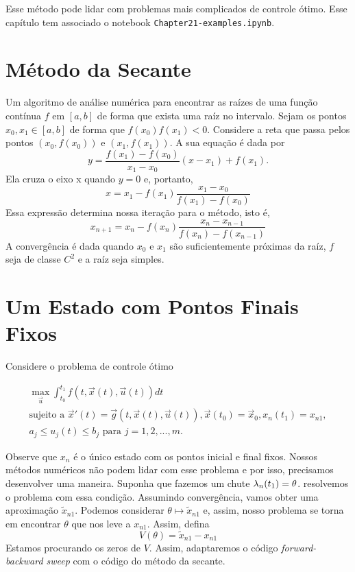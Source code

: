 Esse método pode lidar com problemas mais complicados de controle ótimo. Esse
capítulo tem associado o notebook \texttt{Chapter21-examples.ipynb}. 

\section{Método da Secante}

Um algoritmo de análise numérica para encontrar as raízes de uma função
contínua $f$ em $[a,b]$ de forma que exista uma raíz no intervalo. Sejam os
pontos $x_0, x_1 \in [a,b]$ de forma que $f(x_0)f(x_1) < 0$. Considere a reta
que passa pelos pontos $(x_0, f(x_0))$ e $(x_1, f(x_1))$. A sua equação é dada
por 
$$
y = \frac{f(x_1) - f(x_0)}{x_1 - x_0}(x - x_1) + f(x_1).
$$
Ela cruza o eixo x quando $y = 0$ e, portanto, 
$$
x = x_1 - f(x_1)\frac{x_1 - x_0}{f(x_1) - f(x_0)}
$$
Essa expressão determina nossa iteração para o método, isto é, 
$$
x_{n+1} = x_n - f(x_n)\frac{x_n - x_{n-1}}{f(x_n) - f(x_{n-1})}
$$
A convergência é dada quando $x_0$ e $x_1$ são suficientemente próximas da
raíz, $f$ seja de classe $C^2$ e a raíz seja simples. 

\section{Um Estado com Pontos Finais Fixos}

Considere o problema de controle ótimo 

\begin{gather*}
    \max_{\vec{u}} \int_{t_0}^{t_1} f(t, \vec{x}(t), \vec{u}(t)) dt \\ 
    \text{sujeito a   }\vec{x}'(t) = \vec{g}(t, \vec{x}(t), \vec{u}(t)),  
    \vec{x}(t_0) = \vec{x}_0, x_n(t_1) = x_{n1}, \\
    a_j \le u_j(t) \le b_j \text{ para }j = 1,2,...,m.
\end{gather*}

Observe que $x_n$ é o único estado com os pontos inicial e final fixos. Nossos
métodos numéricos não podem lidar com esse problema e por isso, precisamos
desenvolver uma maneira. Suponha que fazemos um chute $\lambda_n(t_1) = \theta$.
resolvemos o problema com essa condição. Assumindo convergência, vamos obter
uma aproximação $\tilde{x}_{n1}$. Podemos considerar $\theta \mapsto
\tilde{x}_{n1}$ e, assim, nosso problema se torna em encontrar $\theta$ que
nos leve a $x_{n1}$. Assim, defina 
$$
V(\theta) = \tilde{x}_{n1} - x_{n1} 
$$
Estamos procurando os zeros de $V$. Assim, adaptaremos o código
\textit{forward-backward sweep} com o código do método da secante. 

